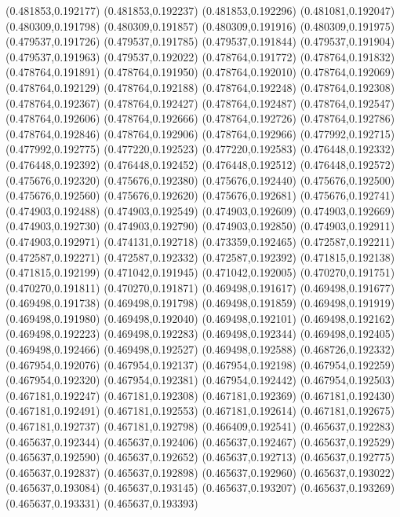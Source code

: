 (0.481853,0.192177)
(0.481853,0.192237)
(0.481853,0.192296)
(0.481081,0.192047)
(0.480309,0.191798)
(0.480309,0.191857)
(0.480309,0.191916)
(0.480309,0.191975)
(0.479537,0.191726)
(0.479537,0.191785)
(0.479537,0.191844)
(0.479537,0.191904)
(0.479537,0.191963)
(0.479537,0.192022)
(0.478764,0.191772)
(0.478764,0.191832)
(0.478764,0.191891)
(0.478764,0.191950)
(0.478764,0.192010)
(0.478764,0.192069)
(0.478764,0.192129)
(0.478764,0.192188)
(0.478764,0.192248)
(0.478764,0.192308)
(0.478764,0.192367)
(0.478764,0.192427)
(0.478764,0.192487)
(0.478764,0.192547)
(0.478764,0.192606)
(0.478764,0.192666)
(0.478764,0.192726)
(0.478764,0.192786)
(0.478764,0.192846)
(0.478764,0.192906)
(0.478764,0.192966)
(0.477992,0.192715)
(0.477992,0.192775)
(0.477220,0.192523)
(0.477220,0.192583)
(0.476448,0.192332)
(0.476448,0.192392)
(0.476448,0.192452)
(0.476448,0.192512)
(0.476448,0.192572)
(0.475676,0.192320)
(0.475676,0.192380)
(0.475676,0.192440)
(0.475676,0.192500)
(0.475676,0.192560)
(0.475676,0.192620)
(0.475676,0.192681)
(0.475676,0.192741)
(0.474903,0.192488)
(0.474903,0.192549)
(0.474903,0.192609)
(0.474903,0.192669)
(0.474903,0.192730)
(0.474903,0.192790)
(0.474903,0.192850)
(0.474903,0.192911)
(0.474903,0.192971)
(0.474131,0.192718)
(0.473359,0.192465)
(0.472587,0.192211)
(0.472587,0.192271)
(0.472587,0.192332)
(0.472587,0.192392)
(0.471815,0.192138)
(0.471815,0.192199)
(0.471042,0.191945)
(0.471042,0.192005)
(0.470270,0.191751)
(0.470270,0.191811)
(0.470270,0.191871)
(0.469498,0.191617)
(0.469498,0.191677)
(0.469498,0.191738)
(0.469498,0.191798)
(0.469498,0.191859)
(0.469498,0.191919)
(0.469498,0.191980)
(0.469498,0.192040)
(0.469498,0.192101)
(0.469498,0.192162)
(0.469498,0.192223)
(0.469498,0.192283)
(0.469498,0.192344)
(0.469498,0.192405)
(0.469498,0.192466)
(0.469498,0.192527)
(0.469498,0.192588)
(0.468726,0.192332)
(0.467954,0.192076)
(0.467954,0.192137)
(0.467954,0.192198)
(0.467954,0.192259)
(0.467954,0.192320)
(0.467954,0.192381)
(0.467954,0.192442)
(0.467954,0.192503)
(0.467181,0.192247)
(0.467181,0.192308)
(0.467181,0.192369)
(0.467181,0.192430)
(0.467181,0.192491)
(0.467181,0.192553)
(0.467181,0.192614)
(0.467181,0.192675)
(0.467181,0.192737)
(0.467181,0.192798)
(0.466409,0.192541)
(0.465637,0.192283)
(0.465637,0.192344)
(0.465637,0.192406)
(0.465637,0.192467)
(0.465637,0.192529)
(0.465637,0.192590)
(0.465637,0.192652)
(0.465637,0.192713)
(0.465637,0.192775)
(0.465637,0.192837)
(0.465637,0.192898)
(0.465637,0.192960)
(0.465637,0.193022)
(0.465637,0.193084)
(0.465637,0.193145)
(0.465637,0.193207)
(0.465637,0.193269)
(0.465637,0.193331)
(0.465637,0.193393)
